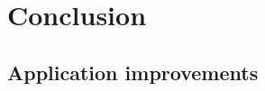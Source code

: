 \chapter{Conclusion}\label{sec:Conclusion}


\section{Application improvements}
\label{sec:ApplicationImprovements}